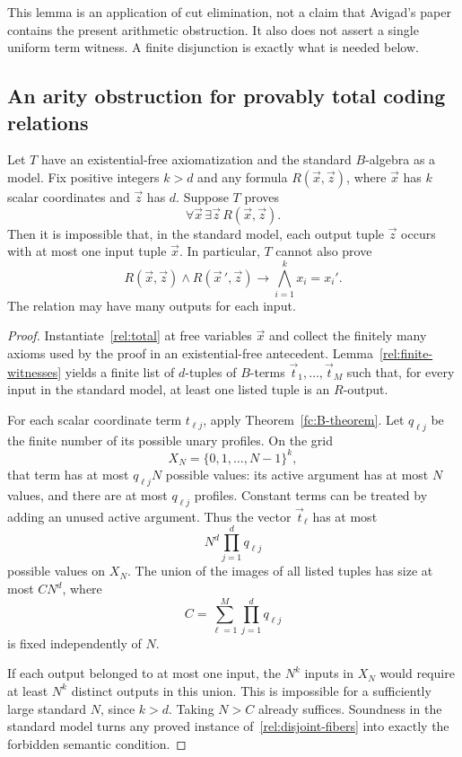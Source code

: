 This lemma is an application of cut elimination, not a claim that
Avigad's paper contains the present arithmetic obstruction. It also
does not assert a single uniform term witness. A finite disjunction is
exactly what is needed below.

\subsection{An arity obstruction for provably total coding relations}

\begin{theorem}
\label{rel:no-compression}
Let $T$ have an existential-free axiomatization and the standard
$B$-algebra as a model. Fix positive integers $k>d$ and any formula
$R(\vec x,\vec z)$, where $\vec x$ has $k$ scalar coordinates and
$\vec z$ has $d$. Suppose $T$ proves
\[
                        \forall\vec x\,\exists\vec z\,R(\vec x,\vec z).
                        \tag{Total}\label{rel:total}
\]
Then it is impossible that, in the standard model, each output tuple
$\vec z$ occurs with at most one input tuple $\vec x$. In particular,
$T$ cannot also prove
\[
 R(\vec x,\vec z)\wedge R(\vec x\,',\vec z)
             \longrightarrow\bigwedge_{i=1}^{k}x_i=x_i'.
 \tag{Disjoint fibers}\label{rel:disjoint-fibers}
\]
The relation may have many outputs for each input.
\end{theorem}

\begin{proof}
Instantiate~\eqref{rel:total} at free variables $\vec x$ and collect
the finitely many axioms used by the proof in an existential-free
antecedent. Lemma~\ref{rel:finite-witnesses} yields a finite list of
$d$-tuples of $B$-terms $\vec t_1,\ldots,\vec t_M$ such that, for every
input in the standard model, at least one listed tuple is an $R$-output.

For each scalar coordinate term $t_{\ell j}$, apply
Theorem~\ref{fc:B-theorem}. Let $q_{\ell j}$ be the finite number of
its possible unary profiles. On the grid
\[
                         X_N=\{0,1,\ldots,N-1\}^{k},
\]
that term has at most $q_{\ell j}N$ possible values: its active argument
has at most $N$ values, and there are at most $q_{\ell j}$ profiles.
Constant terms can be treated by adding an unused active argument.
Thus the vector $\vec t_\ell$ has at most
\[
                         N^d\prod_{j=1}^{d}q_{\ell j}
\]
possible values on $X_N$. The union of the images of all listed tuples
has size at most $CN^d$, where
\[
                         C=\sum_{\ell=1}^{M}\prod_{j=1}^{d}q_{\ell j}
\]
is fixed independently of $N$.

If each output belonged to at most one input, the $N^k$ inputs in $X_N$
would require at least $N^k$ distinct outputs in this union. This is
impossible for a sufficiently large standard $N$, since $k>d$.
Taking $N>C$ already suffices. Soundness in the standard model turns any
proved instance of~\eqref{rel:disjoint-fibers} into exactly the forbidden
semantic condition.
\end{proof}

